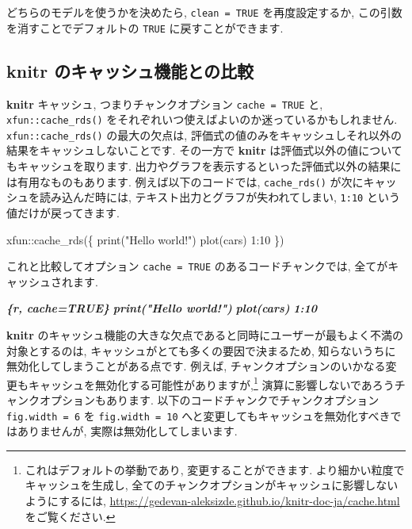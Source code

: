 \documentclass[
  11pt,
  lualatex,ja=standard,jafont=noto]{bxjsreport}
\newenvironment{Shaded}{\begin{snugshade}}{\end{snugshade}}
\newcommand{\DecValTok}[1]{\textcolor[rgb]{0.00,0.00,0.81}{#1}}
\newcommand{\FunctionTok}[1]{\textcolor[rgb]{0.00,0.00,0.00}{#1}}
\newcommand{\InformationTok}[1]{\textcolor[rgb]{0.56,0.35,0.01}{\textbf{\textit{#1}}}}
\newcommand{\NormalTok}[1]{#1}
\newcommand{\SpecialCharTok}[1]{\textcolor[rgb]{0.00,0.00,0.00}{#1}}
\newcommand{\StringTok}[1]{\textcolor[rgb]{0.31,0.60,0.02}{#1}}
\begin{document}
どちらのモデルを使うかを決めたら, \texttt{clean = TRUE} を再度設定するか, この引数を消すことでデフォルトの \texttt{TRUE} に戻すことができます.

\hypertarget{knitr-ux306eux30adux30e3ux30c3ux30b7ux30e5ux6a5fux80fdux3068ux306eux6bd4ux8f03}{%
\subsection{\texorpdfstring{\textbf{knitr} のキャッシュ機能との比較}{knitr のキャッシュ機能との比較}}\label{knitr-ux306eux30adux30e3ux30c3ux30b7ux30e5ux6a5fux80fdux3068ux306eux6bd4ux8f03}}

\textbf{knitr} キャッシュ, つまりチャンクオプション \texttt{cache = TRUE} と, \texttt{xfun::cache\_rds()} をそれぞれいつ使えばよいのか迷っているかもしれません. \texttt{xfun::cache\_rds()} の最大の欠点は, 評価式の値のみをキャッシュしそれ以外の結果をキャッシュしないことです. その一方で \textbf{knitr} は評価式以外の値についてもキャッシュを取ります. 出力やグラフを表示するといった評価式以外の結果には有用なものもあります. 例えば以下のコードでは, \texttt{cache\_rds()} が次にキャッシュを読み込んだ時には, テキスト出力とグラフが失われてしまい, \texttt{1:10} という値だけが戻ってきます.

\begin{Shaded}
\begin{Highlighting}[numbers=left,,]
\NormalTok{xfun}\SpecialCharTok{::}\FunctionTok{cache\_rds}\NormalTok{(\{}
  \FunctionTok{print}\NormalTok{(}\StringTok{"Hello world!"}\NormalTok{)}
  \FunctionTok{plot}\NormalTok{(cars)}
  \DecValTok{1}\SpecialCharTok{:}\DecValTok{10}
\NormalTok{\})}
\end{Highlighting}
\end{Shaded}

これと比較してオプション \texttt{cache = TRUE} のあるコードチャンクでは, 全てがキャッシュされます.

\begin{Shaded}
\begin{Highlighting}[]
\InformationTok{\textasciigrave{}\textasciigrave{}\textasciigrave{}\{r, cache=TRUE\}}
\InformationTok{print("Hello world!")}
\InformationTok{plot(cars)}
\InformationTok{1:10}
\InformationTok{\textasciigrave{}\textasciigrave{}\textasciigrave{}}
\end{Highlighting}
\end{Shaded}

\textbf{knitr} のキャッシュ機能の大きな欠点であると同時にユーザーが最もよく不満の対象とするのは, キャッシュがとても多くの要因で決まるため, 知らないうちに無効化してしまうことがある点です. 例えば, チャンクオプションのいかなる変更もキャッシュを無効化する可能性がありますが,\footnote{これはデフォルトの挙動であり, 変更することができます. より細かい粒度でキャッシュを生成し, 全てのチャンクオプションがキャッシュに影響しないようにするには, \url{https://gedevan-aleksizde.github.io/knitr-doc-ja/cache.html} をご覧ください.} 演算に影響しないであろうチャンクオプションもあります. 以下のコードチャンクでチャンクオプション \texttt{fig.width = 6} を \texttt{fig.width = 10} へと変更してもキャッシュを無効化すべきではありませんが, 実際は無効化してしまいます.
\end{document}
